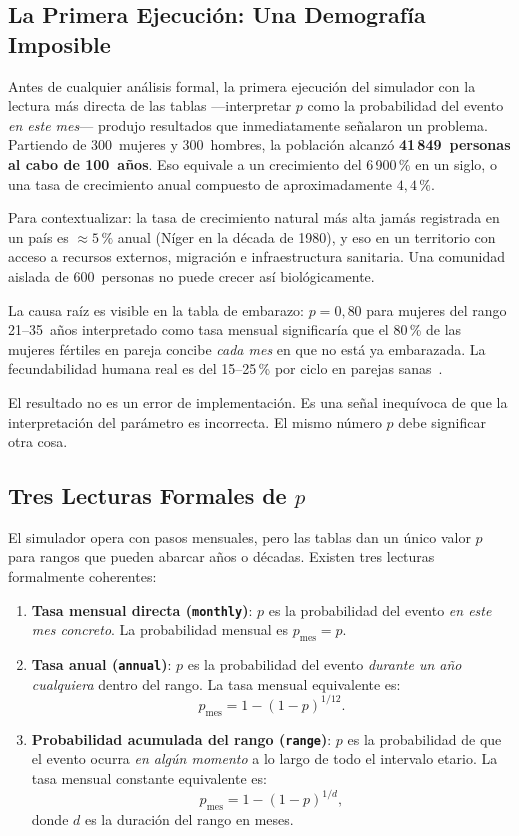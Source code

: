 \documentclass{llncs}
\begin{document}
\subsection{La Primera Ejecución: Una Demografía Imposible}

Antes de cualquier análisis formal, la primera ejecución del simulador con
la lectura más directa de las tablas ---interpretar $p$ como la probabilidad
del evento \emph{en este mes}--- produjo resultados que inmediatamente
señalaron un problema.
Partiendo de 300~mujeres y 300~hombres, la población alcanzó
\textbf{41\,849~personas al cabo de 100~años}.
Eso equivale a un crecimiento del 6\,900\,\% en un siglo, o una tasa de
crecimiento anual compuesto de aproximadamente $4{,}4\,\%$.

Para contextualizar: la tasa de crecimiento natural más alta jamás registrada
en un país es $\approx 5\,\%$ anual (Níger en la década de 1980), y eso en
un territorio con acceso a recursos externos, migración e infraestructura
sanitaria.
Una comunidad aislada de 600~personas no puede crecer así biológicamente.

La causa raíz es visible en la tabla de embarazo:
$p = 0{,}80$ para mujeres del rango 21--35~años interpretado como tasa
mensual significaría que el 80\,\% de las mujeres fértiles en pareja
concibe \emph{cada mes} en que no está ya embarazada.
La fecundabilidad humana real es del 15--25\,\% por ciclo en parejas
sanas~\cite{law2015}.

El resultado no es un error de implementación.
Es una señal inequívoca de que la interpretación del parámetro es incorrecta.
El mismo número $p$ debe significar otra cosa.

\subsection{Tres Lecturas Formales de $p$}

El simulador opera con pasos mensuales, pero las tablas dan un único valor
$p$ para rangos que pueden abarcar años o décadas.
Existen tres lecturas formalmente coherentes:

\begin{enumerate}
  \item \textbf{Tasa mensual directa (\texttt{monthly})}: $p$ es la
        probabilidad del evento \emph{en este mes concreto}.
        La probabilidad mensual es $p_{\text{mes}} = p$.

  \item \textbf{Tasa anual (\texttt{annual})}: $p$ es la probabilidad del
        evento \emph{durante un año cualquiera} dentro del rango.
        La tasa mensual equivalente es:
        \[
          p_{\text{mes}} = 1 - (1-p)^{1/12}.
        \]

  \item \textbf{Probabilidad acumulada del rango (\texttt{range})}: $p$ es
        la probabilidad de que el evento ocurra \emph{en algún momento} a
        lo largo de todo el intervalo etario.
        La tasa mensual constante equivalente es:
        \[
          p_{\text{mes}} = 1 - (1-p)^{1/d},
        \]
        donde $d$ es la duración del rango en meses.
\end{enumerate}
\end{document}
